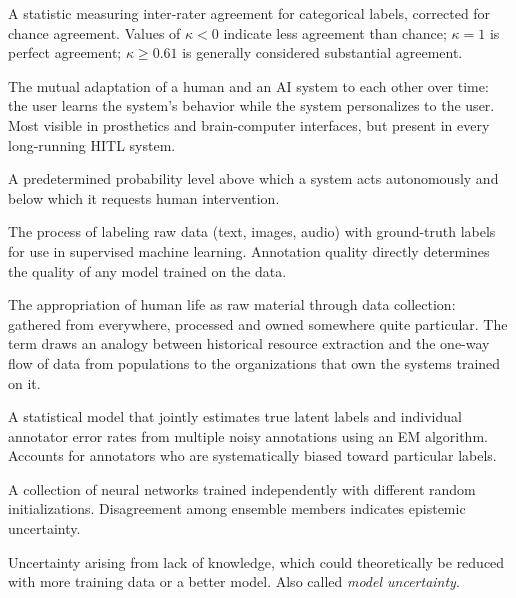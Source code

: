 \begin{description}[style=nextline, leftmargin=2em]
\item[Cohen's Kappa ($\kappa$)]
A statistic measuring inter-rater agreement for categorical labels, corrected for chance agreement. Values of $\kappa < 0$ indicate less agreement than chance; $\kappa = 1$ is perfect agreement; $\kappa \geq 0.61$ is generally considered substantial agreement.

\item[Co-Adaptation]
The mutual adaptation of a human and an AI system to each other over time: the user learns the system's behavior while the system personalizes to the user. Most visible in prosthetics and brain-computer interfaces, but present in every long-running HITL system.

\item[Confidence Threshold]
A predetermined probability level above which a system acts autonomously and below which it requests human intervention.

\item[Data Annotation]
The process of labeling raw data (text, images, audio) with ground-truth labels for use in supervised machine learning. Annotation quality directly determines the quality of any model trained on the data.

\item[Data Colonialism]
The appropriation of human life as raw material through data collection: gathered from everywhere, processed and owned somewhere quite particular. The term draws an analogy between historical resource extraction and the one-way flow of data from populations to the organizations that own the systems trained on it.

\item[Dawid-Skene Model]
A statistical model that jointly estimates true latent labels and individual annotator error rates from multiple noisy annotations using an EM algorithm. Accounts for annotators who are systematically biased toward particular labels.

\item[Deep Ensemble]
A collection of neural networks trained independently with different random initializations. Disagreement among ensemble members indicates epistemic uncertainty.

\item[Epistemic Uncertainty]
Uncertainty arising from lack of knowledge, which could theoretically be reduced with more training data or a better model. Also called \emph{model uncertainty}.


\end{description}
